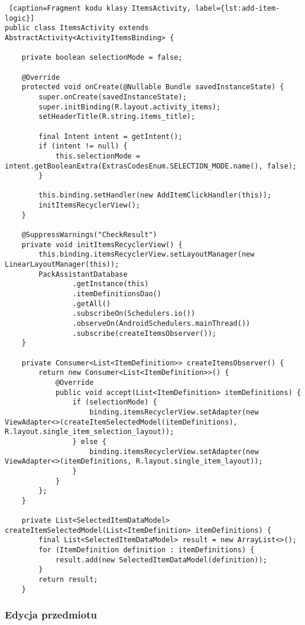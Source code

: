 \documentclass[a4paper,12pt]{article}
\begin{document}
\begin{lstlisting} [caption=Fragment kodu klasy ItemsActivity, label={lst:add-item-logic}]
public class ItemsActivity extends AbstractActivity<ActivityItemsBinding> {

    private boolean selectionMode = false;

    @Override
    protected void onCreate(@Nullable Bundle savedInstanceState) {
        super.onCreate(savedInstanceState);
        super.initBinding(R.layout.activity_items);
        setHeaderTitle(R.string.items_title);

        final Intent intent = getIntent();
        if (intent != null) {
            this.selectionMode = intent.getBooleanExtra(ExtrasCodesEnum.SELECTION_MODE.name(), false);
        }

        this.binding.setHandler(new AddItemClickHandler(this));
        initItemsRecyclerView();
    }

    @SuppressWarnings("CheckResult")
    private void initItemsRecyclerView() {
        this.binding.itemsRecyclerView.setLayoutManager(new LinearLayoutManager(this));
        PackAssistantDatabase
                .getInstance(this)
                .itemDefinitionsDao()
                .getAll()
                .subscribeOn(Schedulers.io())
                .observeOn(AndroidSchedulers.mainThread())
                .subscribe(createItemsObserver());
    }

    private Consumer<List<ItemDefinition>> createItemsObserver() {
        return new Consumer<List<ItemDefinition>>() {
            @Override
            public void accept(List<ItemDefinition> itemDefinitions) {
                if (selectionMode) {
                    binding.itemsRecyclerView.setAdapter(new ViewAdapter<>(createItemSelectedModel(itemDefinitions), R.layout.single_item_selection_layout));
                } else {
                    binding.itemsRecyclerView.setAdapter(new ViewAdapter<>(itemDefinitions, R.layout.single_item_layout));
                }
            }
        };
    }

    private List<SelectedItemDataModel> createItemSelectedModel(List<ItemDefinition> itemDefinitions) {
        final List<SelectedItemDataModel> result = new ArrayList<>();
        for (ItemDefinition definition : itemDefinitions) {
            result.add(new SelectedItemDataModel(definition));
        }
        return result;
    }
\end{lstlisting}

\subsubsection{Edycja przedmiotu}
\end{document}
